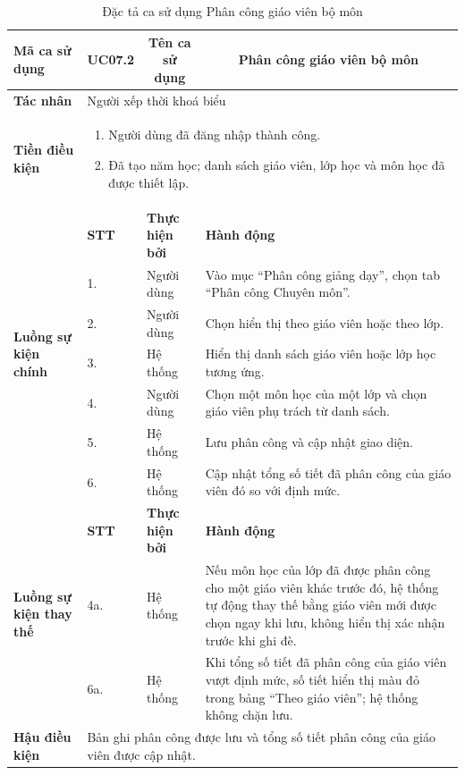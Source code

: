 \documentclass[../DoAn.tex]{subfiles}
\begin{document}
\begin{longtable}{|p{2.8cm}|p{1cm}|p{2.8cm}|p{6.3cm}|}
\caption{Đặc tả ca sử dụng Phân công giáo viên bộ môn}
\label{tab:uc_phan_cong_bo_mon} \\
\hline
\multicolumn{1}{|l|}{\textbf{Mã ca sử dụng}} & \multicolumn{1}{c|}{UC07.2} & \multicolumn{1}{c|}{\textbf{Tên ca sử dụng}} & \multicolumn{1}{c|}{Phân công giáo viên bộ môn} \\
\hline
\multicolumn{1}{|l|}{\textbf{Tác nhân}} & \multicolumn{3}{l|}{Người xếp thời khoá biểu} \\
\hline
\multicolumn{1}{|l|}{\textbf{Tiền điều kiện}} & \multicolumn{3}{p{10.5cm}|}{
\begin{enumerate}[leftmargin=*, noitemsep, topsep=0pt, partopsep=0pt, parsep=0pt]
    \item Người dùng đã đăng nhập thành công.
    \item Đã tạo năm học; danh sách giáo viên, lớp học và môn học đã được thiết lập.
\end{enumerate}} \\
\hline
\multirow{7}{2.8cm}{\textbf{Luồng sự kiện chính}} & \textbf{STT} & \textbf{Thực hiện bởi} & \textbf{Hành động} \\
\cline{2-4}
& 1. & Người dùng & Vào mục ``Phân công giảng dạy'', chọn tab ``Phân công Chuyên môn''. \\
\cline{2-4}
& 2. & Người dùng & Chọn hiển thị theo giáo viên hoặc theo lớp. \\
\cline{2-4}
& 3. & Hệ thống & Hiển thị danh sách giáo viên hoặc lớp học tương ứng. \\
\cline{2-4}
& 4. & Người dùng & Chọn một môn học của một lớp và chọn giáo viên phụ trách từ danh sách. \\
\cline{2-4}
& 5. & Hệ thống & Lưu phân công và cập nhật giao diện. \\
\cline{2-4}
& 6. & Hệ thống & Cập nhật tổng số tiết đã phân công của giáo viên đó so với định mức. \\
\hline
\multirow{3}{2.8cm}{\textbf{Luồng sự kiện thay thế}} & \textbf{STT} & \textbf{Thực hiện bởi} & \textbf{Hành động} \\
\cline{2-4}
& 4a. & Hệ thống & Nếu môn học của lớp đã được phân công cho một giáo viên khác trước đó, hệ thống tự động thay thế bằng giáo viên mới được chọn ngay khi lưu, không hiển thị xác nhận trước khi ghi đè. \\
\cline{2-4}
& 6a. & Hệ thống & Khi tổng số tiết đã phân công của giáo viên vượt định mức, số tiết hiển thị màu đỏ trong bảng ``Theo giáo viên''; hệ thống không chặn lưu. \\
\hline
\multicolumn{1}{|l|}{\textbf{Hậu điều kiện}} & \multicolumn{3}{p{10.5cm}|}{Bản ghi phân công được lưu và tổng số tiết phân công của giáo viên được cập nhật.} \\
\hline
\end{longtable}
\end{document}
